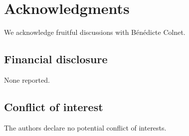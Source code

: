 \documentclass[11pt]{article}
\begin{document}
\section*{Acknowledgments}

We acknowledge fruitful discussions with Bénédicte Colnet.

\subsection*{Financial disclosure}

None reported.

\subsection*{Conflict of interest}

The authors declare no potential conflict of interests.

\printbibliography

\clearpage

\onecolumn

\renewcommand\thefigure{S\arabic{figure}}
\renewcommand\thetable{S\arabic{table}}
\setcounter{figure}{0}
\setcounter{table}{0}
\end{document}
